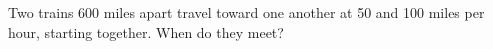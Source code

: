 Two trains 600 miles apart travel toward one another at 50 and 100 miles per hour, starting together. When do they meet?

